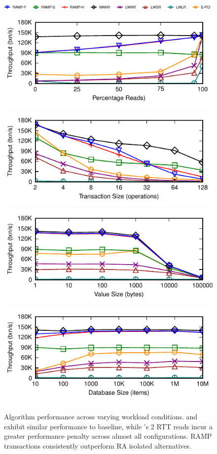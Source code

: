 \begin{figure}[th!]
\begin{center}
\includegraphics[width=\textwidth]{figs/legend-oneline.pdf}\vspace{0em}
\includegraphics[width=.65\columnwidth]{figs/rprop-thru.pdf}\vspace{-1em}
\includegraphics[width=.65\columnwidth]{figs/txnlen-thru.pdf}\vspace{-1em}
\includegraphics[width=.65\columnwidth]{figs/valuesize-thru.pdf}\vspace{-1em}
\includegraphics[width=.65\columnwidth]{figs/numkeys-thru.pdf}
\end{center}
\caption{Algorithm performance across varying workload
  conditions. \rapl and \rapb exhibit similar performance to \nwnr
  baseline, while \raps's 2 RTT reads incur a greater performance penalty
  across almost all configurations. RAMP transactions consistently
  outperform RA isolated alternatives.}
\label{fig:others}
\end{figure}

